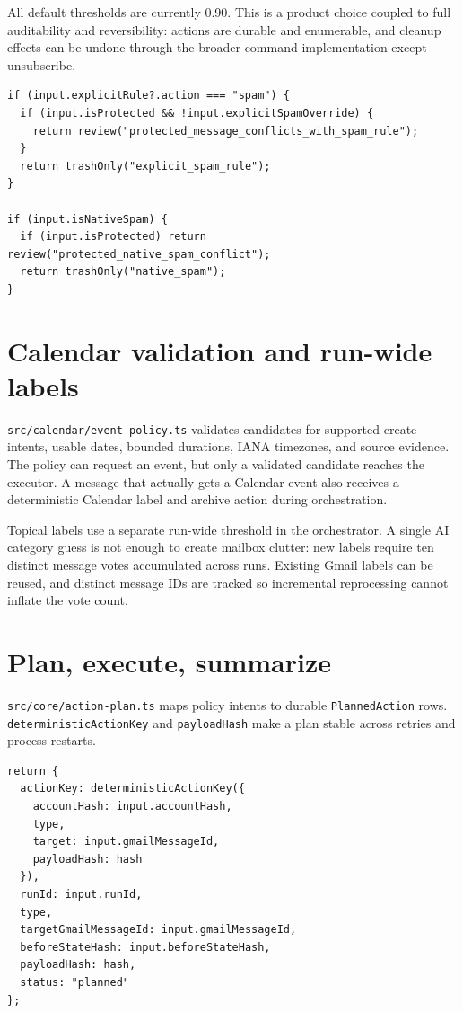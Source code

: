 \documentclass[12pt,oneside]{book}
\newcommand{\code}[1]{\nolinkurl{#1}}
\newcommand{\file}[1]{\nolinkurl{#1}}
\begin{document}
All default thresholds are currently 0.90. This is a product choice coupled to full auditability and reversibility: actions are durable and enumerable, and cleanup effects can be undone through the broader command implementation except unsubscribe.

\begin{lstlisting}[caption={Policy is a pure precedence gate, not a model callback.},label={lst:policy}]
if (input.explicitRule?.action === "spam") {
  if (input.isProtected && !input.explicitSpamOverride) {
    return review("protected_message_conflicts_with_spam_rule");
  }
  return trashOnly("explicit_spam_rule");
}

if (input.isNativeSpam) {
  if (input.isProtected) return review("protected_native_spam_conflict");
  return trashOnly("native_spam");
}
\end{lstlisting}

\section{Calendar validation and run-wide labels}

\file{src/calendar/event-policy.ts} validates candidates for supported create intents, usable dates, bounded durations, IANA timezones, and source evidence. The policy can request an event, but only a validated candidate reaches the executor. A message that actually gets a Calendar event also receives a deterministic Calendar label and archive action during orchestration.

Topical labels use a separate run-wide threshold in the orchestrator. A single AI category guess is not enough to create mailbox clutter: new labels require ten distinct message votes accumulated across runs. Existing Gmail labels can be reused, and distinct message IDs are tracked so incremental reprocessing cannot inflate the vote count.

\section{Plan, execute, summarize}

\file{src/core/action-plan.ts} maps policy intents to durable \code{PlannedAction} rows. \code{deterministicActionKey} and \code{payloadHash} make a plan stable across retries and process restarts.

\begin{lstlisting}[caption={Action keys are deterministic and carry the pre-mutation state hash.},label={lst:actions}]
return {
  actionKey: deterministicActionKey({
    accountHash: input.accountHash,
    type,
    target: input.gmailMessageId,
    payloadHash: hash
  }),
  runId: input.runId,
  type,
  targetGmailMessageId: input.gmailMessageId,
  beforeStateHash: input.beforeStateHash,
  payloadHash: hash,
  status: "planned"
};
\end{lstlisting}
\end{document}
